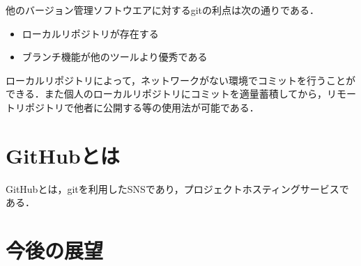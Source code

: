 \documentclass[a4paper,10pt,twocolumn]{jsarticle}
\begin{document}
他のバージョン管理ソフトウエアに対するgitの利点は次の通りである．
\begin{itemize}
\item ローカルリポジトリが存在する
\item ブランチ機能が他のツールより優秀である
\end{itemize}
ローカルリポジトリによって，ネットワークがない環境でコミットを行うことができる．また個人のローカルリポジトリにコミットを適量蓄積してから，リモートリポジトリで他者に公開する等の使用法が可能である．

\section{GitHubとは}
GitHubとは，gitを利用したSNSであり，プロジェクトホスティングサービスである．

\section{今後の展望}

\small
\begin{thebibliography}{99}
\end{thebibliography}
\end{document}
